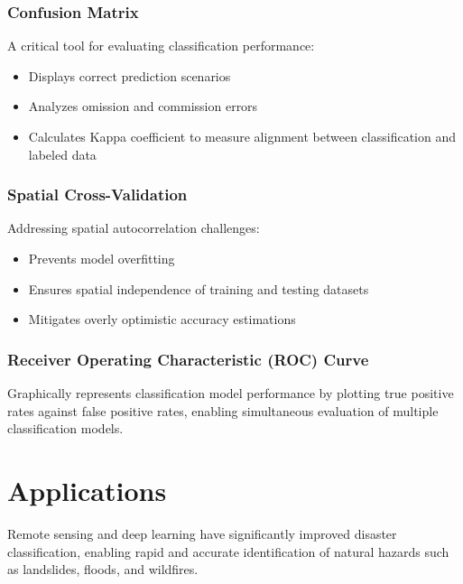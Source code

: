 \documentclass[
  letterpaper,
]{scrbook}
\begin{document}
\subsubsection{Confusion Matrix}\label{confusion-matrix}

A critical tool for evaluating classification performance:

\begin{itemize}
\item
  Displays correct prediction scenarios
\item
  Analyzes omission and commission errors
\item
  Calculates Kappa coefficient to measure alignment between
  classification and labeled data
\end{itemize}

\subsubsection{Spatial Cross-Validation}\label{spatial-cross-validation}

Addressing spatial autocorrelation challenges:

\begin{itemize}
\item
  Prevents model overfitting
\item
  Ensures spatial independence of training and testing datasets
\item
  Mitigates overly optimistic accuracy estimations
\end{itemize}

\subsubsection{Receiver Operating Characteristic (ROC)
Curve}\label{receiver-operating-characteristic-roc-curve}

Graphically represents classification model performance by plotting true
positive rates against false positive rates, enabling simultaneous
evaluation of multiple classification models.

\section{Applications}\label{applications-5}

Remote sensing and deep learning have significantly improved disaster
classification, enabling rapid and accurate identification of natural
hazards such as landslides, floods, and wildfires.
\end{document}
